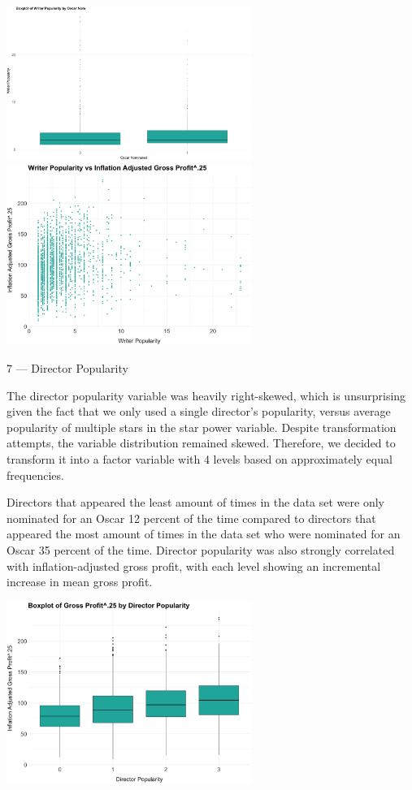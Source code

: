 \documentclass[10pt]{article}
\begin{document}
\begin{center}
\includegraphics[width=8cm]{_assets/_eda/writer_pop_on.png}
\hspace{1cm}
\includegraphics[width=8cm]{_assets/_eda/writer_pop_iagp.png}
\end{center}

7 --- Director Popularity

The director popularity variable was heavily right-skewed, which is unsurprising given the fact that we only used a single director’s popularity, versus average popularity of multiple stars in the star power variable. Despite transformation attempts, the variable distribution remained skewed. Therefore, we decided to transform it into a factor variable with 4 levels based on approximately equal frequencies. 

Directors that appeared the least amount of times in the data set were only nominated for an Oscar 12 percent of the time compared to directors that appeared the most amount of times in the data set who were nominated for an Oscar 35 percent of the time. Director popularity was also strongly correlated with inflation-adjusted gross profit, with each level showing an incremental increase in mean gross profit. 

\begin{center}
\includegraphics[width=8cm]{_assets/_eda/dir_pop_iagp_bp.png}

\end{center}
\end{document}

